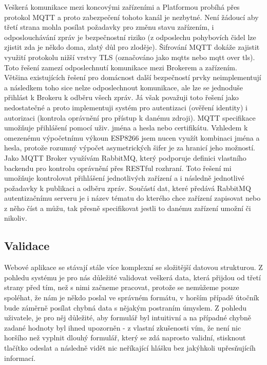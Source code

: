 Veškerá komunikace mezi koncovými zařízeními a Platformou probíhá přes protokol MQTT a proto zabezpečení tohoto kanál je nezbytné. Není žádoucí aby třetí strana mohla posílat požadavky pro změnu stavu zařízením, i odposlouchávání zpráv je bezpečnostní riziko (z odposlechu pohybovích čidel lze zjistit zda je někdo doma, zlatý důl pro zloděje). Šifrování MQTT dokáže zajistit využití protokolu nižší vrstvy TLS (označováno jako mqtts nebo mqtt over tls). Toto řešení zamezí odposlechnutí komunikace mezi Brokerem a zařízením. Většina existujících řešení pro domácnost další bezpečností prvky neimplementují a následkem toho sice nelze odposlechnout komunikace, ale lze se jednoduše přihlást k Brokeru k odběru všech zpráv. Já však považuji toto řešení jako nedostatečné a proto implementuji systém pro autentizaci (ověření identity) i autorizaci (kontrola oprávnění pro přístup k danému zdroji). MQTT specifikace umožňuje přihlášení pomocí uživ. jména a hesla nebo certifikátu. Vzhledem k omezenému výpočetnímu výkoun ESP8266 jsem nucen využít kombinaci jména a hesla, protože rozumný výpočet asymetrických šifer je za hranicí jeho možností. Jako MQTT Broker využívám RabbitMQ, který podporuje definici vlastního backendu pro kontrolu oprávnění přes RESTful rozhraní. Toto řešení mi umožňuje kontrolovat přihlášení jednotlivých zařízení a i následně jednotlivé požadavky k publikaci a odběru zpráv. Součástí dat, které předává RabbitMQ autentizačnímu serveru je i název tématu do kterého chce zařízení zapisovat nebo z něho číst a můžu, tak přesně specifikovat jestli to danému zařízení umožní či nikoliv.

\subsection{Validace}
\label{BE:Validace}
Webové aplikace se stávají stále více komplexní se složitější datovou strukturou. Z pohledu systému je pro nás důležité validovat veškerá data, která přijdou od třetí strany před tím, než s nimi začneme pracovat, protože se nemůžeme pouze spoléhat, že nám je někdo poslal ve správném formátu, v horším případě útočník bude záměrně posílat chybná data s nějakým postraním úmyslem. Z pohledu uživatele, je pro něj důležité, aby formulář byl intuitivní a na případné chybně zadané hodnoty byl ihned upozorněn - z vlastní zkušenosti vím, že není nic horšího než vyplnit dlouhý formulář, který se zdá naprosto validní, stisknout tlačítko odeslat a následně vidět nic neříkající hlášku  bez jakýhkoli upřesňujícíh informací.

